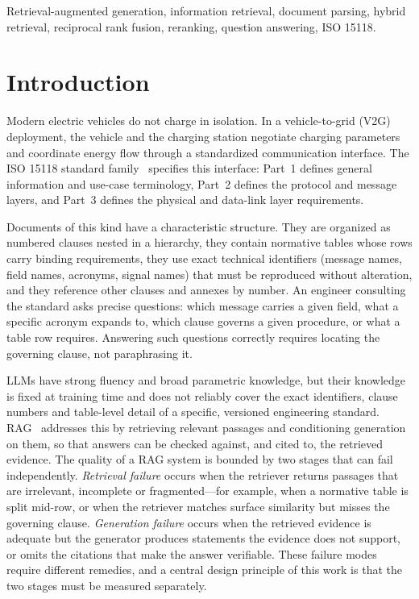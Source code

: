 \documentclass[conference]{IEEEtran}
\begin{document}
\begin{IEEEkeywords}
Retrieval-augmented generation, information retrieval, document parsing, hybrid retrieval, reciprocal rank fusion, reranking, question answering, ISO 15118.
\end{IEEEkeywords}

\section{Introduction}
Modern electric vehicles do not charge in isolation. In a vehicle-to-grid (V2G) deployment, the vehicle and the charging station negotiate charging parameters and coordinate energy flow through a standardized communication interface. The ISO 15118 standard family~\cite{iso15118} specifies this interface: Part~1 defines general information and use-case terminology, Part~2 defines the protocol and message layers, and Part~3 defines the physical and data-link layer requirements.

Documents of this kind have a characteristic structure. They are organized as numbered clauses nested in a hierarchy, they contain normative tables whose rows carry binding requirements, they use exact technical identifiers (message names, field names, acronyms, signal names) that must be reproduced without alteration, and they reference other clauses and annexes by number. An engineer consulting the standard asks precise questions: which message carries a given field, what a specific acronym expands to, which clause governs a given procedure, or what a table row requires. Answering such questions correctly requires locating the governing clause, not paraphrasing it.

LLMs have strong fluency and broad parametric knowledge, but their knowledge is fixed at training time and does not reliably cover the exact identifiers, clause numbers and table-level detail of a specific, versioned engineering standard. RAG~\cite{lewis2020} addresses this by retrieving relevant passages and conditioning generation on them, so that answers can be checked against, and cited to, the retrieved evidence. The quality of a RAG system is bounded by two stages that can fail independently. \emph{Retrieval failure} occurs when the retriever returns passages that are irrelevant, incomplete or fragmented---for example, when a normative table is split mid-row, or when the retriever matches surface similarity but misses the governing clause. \emph{Generation failure} occurs when the retrieved evidence is adequate but the generator produces statements the evidence does not support, or omits the citations that make the answer verifiable. These failure modes require different remedies, and a central design principle of this work is that the two stages must be measured separately.
\end{document}
